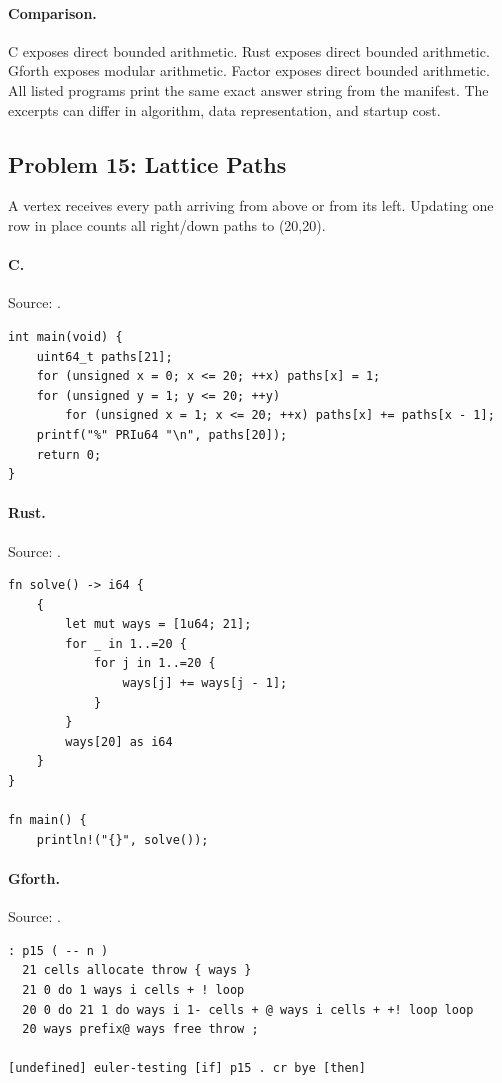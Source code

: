 \paragraph{Comparison.}
C exposes direct bounded arithmetic. Rust exposes direct bounded arithmetic. Gforth exposes modular arithmetic. Factor exposes direct bounded arithmetic.
All listed programs print the same exact answer string from the manifest. The excerpts can differ in algorithm, data representation, and startup cost.

\subsection{Problem 15: Lattice Paths}
\label{walkthrough:p15}
A vertex receives every path arriving from above or from its left. Updating one row in place counts all right/down paths to (20,20).

\paragraph{C.} Source: .
\begin{lstlisting}
int main(void) {
    uint64_t paths[21];
    for (unsigned x = 0; x <= 20; ++x) paths[x] = 1;
    for (unsigned y = 1; y <= 20; ++y)
        for (unsigned x = 1; x <= 20; ++x) paths[x] += paths[x - 1];
    printf("%" PRIu64 "\n", paths[20]);
    return 0;
}
\end{lstlisting}

\paragraph{Rust.} Source: .
\begin{lstlisting}
fn solve() -> i64 {
    {
        let mut ways = [1u64; 21];
        for _ in 1..=20 {
            for j in 1..=20 {
                ways[j] += ways[j - 1];
            }
        }
        ways[20] as i64
    }
}

fn main() {
    println!("{}", solve());
\end{lstlisting}

\paragraph{Gforth.} Source: .
\begin{lstlisting}
: p15 ( -- n )
  21 cells allocate throw { ways }
  21 0 do 1 ways i cells + ! loop
  20 0 do 21 1 do ways i 1- cells + @ ways i cells + +! loop loop
  20 ways prefix@ ways free throw ;

[undefined] euler-testing [if] p15 . cr bye [then]
\end{lstlisting}

